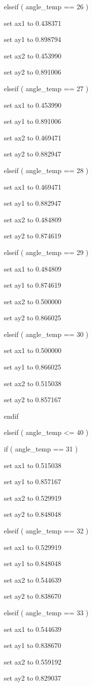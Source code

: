 \documentclass[
]{article}
\begin{document}
elseif ( angle\_temp == 26 )

set ax1 to 0.438371

set ay1 to 0.898794

set ax2 to 0.453990

set ay2 to 0.891006

elseif ( angle\_temp == 27 )

set ax1 to 0.453990

set ay1 to 0.891006

set ax2 to 0.469471

set ay2 to 0.882947

elseif ( angle\_temp == 28 )

set ax1 to 0.469471

set ay1 to 0.882947

set ax2 to 0.484809

set ay2 to 0.874619

elseif ( angle\_temp == 29 )

set ax1 to 0.484809

set ay1 to 0.874619

set ax2 to 0.500000

set ay2 to 0.866025

elseif ( angle\_temp == 30 )

set ax1 to 0.500000

set ay1 to 0.866025

set ax2 to 0.515038

set ay2 to 0.857167

endif

elseif ( angle\_temp \textless= 40 )

if ( angle\_temp == 31 )

set ax1 to 0.515038

set ay1 to 0.857167

set ax2 to 0.529919

set ay2 to 0.848048

elseif ( angle\_temp == 32 )

set ax1 to 0.529919

set ay1 to 0.848048

set ax2 to 0.544639

set ay2 to 0.838670

elseif ( angle\_temp == 33 )

set ax1 to 0.544639

set ay1 to 0.838670

set ax2 to 0.559192

set ay2 to 0.829037
\end{document}
